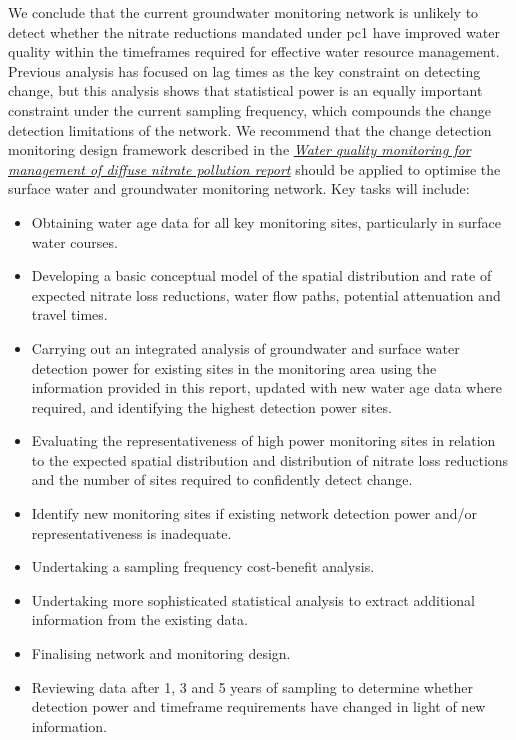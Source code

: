 We conclude that the current groundwater monitoring network is unlikely to detect whether the nitrate reductions mandated under \gls{pc1} have improved water quality within the timeframes required for effective water resource management.
Previous analysis has focused on lag times as the key constraint on detecting change, but this analysis shows that statistical power is an equally important constraint under the current sampling frequency, which compounds the change detection limitations of the network.
We recommend that the change detection monitoring design framework described in the \textit{\href{https://github.com/Komanawa-Solutions-Ltd/gw_detect_power/blob/main/supporting_documents/Water_quality_monitoring_for_management_of_diffuse_nitrate_pollution_Final.pdf}{Water quality monitoring for management of diffuse nitrate pollution report}}\citep{olw_guidance}
should be applied to optimise the surface water and groundwater monitoring network. Key tasks will include:
\begin{itemize}
    \item Obtaining water age data for all key monitoring sites, particularly in surface water courses.
    \item Developing a basic conceptual model of the spatial distribution and rate of expected nitrate loss reductions, water flow paths, potential attenuation and travel times.
    \item Carrying out an integrated analysis of groundwater and surface water detection power for existing sites in the monitoring area using the information provided in this report, updated with new water age data where required, and identifying the highest detection power sites.
    \item Evaluating the representativeness of high power monitoring sites in relation to the expected spatial distribution and distribution of nitrate loss reductions and the number of sites required to confidently detect change.
    \item Identify new monitoring sites if existing network detection power and/or representativeness is inadequate.
    \item Undertaking a sampling frequency cost-benefit analysis.
    \item Undertaking more sophisticated statistical analysis to extract additional information from the existing data.
    \item Finalising network and monitoring design.
    \item Reviewing data after 1, 3 and 5 years of sampling to determine whether detection power and timeframe requirements have changed in light of new information.
\end{itemize}
